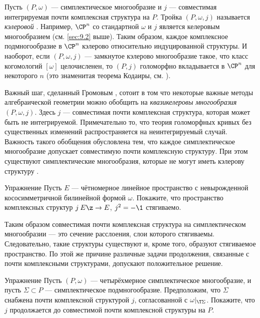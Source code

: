 Пусть $(P, \omega)$ --- симплектическое многообразие и $j$ --- совместимая интегрируемая почти комплексная структура на $P$.
Тройка $(P, \omega, j)$ называется \emph{кэлеровой} .
Например, $\CP^n$ со стандартной $\omega$ и $j$ является келеровым многообразием (см. \ref{sec:9.2} выше).
Таким образом, каждое комплексное подмногообразие в $\CP^n$ кэлерово относительно индуцированной структуры.
И наоборот, если $(P, \omega, j)$ --- замкнутое кэлерово многообразие такое, что класс когомологий $[\omega]$ целочисленен, то $(P, j)$ голоморфно вкладывается в $\CP^n$ для некоторого $n$ (это знаменитая теорема Кодаиры, см. \cite{GH}).

Важный шаг, сделанный Громовым \cite{G1}, сотоит в том что некоторые важные методы алгебраической геометрии можно обобщить на \emph{квазикелеровы многообразия} $(P, \omega, j)$.
Здесь $j$ --- совместимая почти комплексная структура, которая может быть не интегрируемой.
Примечательно то, что теория голоморфных кривых без существенных изменений распространяется на неинтегрируемый случай.
Важность такого обобщения обусловлена тем, что
каждое симплектическое многообразие допускает совместимую почти комплексную структуру.
При этом существуют симплектические многообразия, которые не могут иметь кэлерову структуру \cite{MS}.

\begin{ex}[\cite{MS}]{Упражнение}\label{10.2.B}
Пусть $E$ --- чётномерное линейное пространство с невырожденной кососимметричной билинейной формой $\omega$.
Покажите, что пространство комплексных структур $j\: E \z\to E$, $j^2 = -\1$ стягиваемо.
\end{ex}

Таким образом совместимая почти комплексная структура на симплектическом многообразии --- это сечение расслоения, слои которого стягиваемы.
Следовательно, такие структуры существуют и, кроме того, образуют стягиваемое пространство.
По этой же причине различные задачи продолжения, связанные с почти комплексными структурами, допускают положительное решение.

\begin{ex}{Упражнение}\label{10.2.С}
Пусть $(P, \omega)$ --- четырёхмерное симплектическое многообразие, и пусть $\Sigma \subset P$ --- симплектическое подмногообразие.
Предположим, что $\Sigma$ снабжена почти комплексной структурой $j$, согласованной с $\omega|_{\T \Sigma}$.
Покажите, что $j$ продолжается до совместимой почти комплексной структуры на $P$.
\end{ex}


